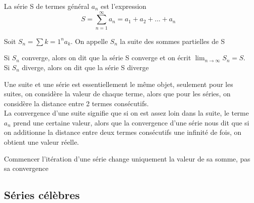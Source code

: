 \documentclass{article}
\begin{document}
\begin{definition}
    La série S de termes général $a_n$ est l'expression
    $$ S = \sum_{n=1}^{\infty} a_n = a_1 + a_2 + ... + a_n$$
\end{definition}

\begin{definition}
    Soit $S_n = \sum{k=1}^{n} a_k$. On appelle $S_n$ la suite des sommes
    partielles de S
\end{definition}

\begin{definition}
    Si $S_n$ converge, alors on dit que la série S converge et on écrit
    $ \lim_{n \to \infty} S_n = S$. Si $S_n$ diverge, alors on dit que
    la série S diverge
\end{definition}

\begin{intuition}
    Une suite et une série est essentiellement le même objet, seulement
    pour les suites, on considère la valeur de chaque terme, alors que
    pour les séries, on considère la distance entre 2 termes consécutifs.\\
    La convergence d'une suite signifie que si on est assez loin dans
    la suite, le terme $a_n$ prend une certaine valeur, alors que la
    convergence d'une série nous dit que si on additionne la distance
    entre deux termes consécutifs une infinité de fois, on obtient une
    valeur réelle.
\end{intuition}

\begin{remark}
    Commencer l'itération d'une série change uniquement la valeur de
    sa somme, pas sa convergence
\end{remark}

\begin{theorem}

\end{theorem}

\begin{theorem}

\end{theorem}



\subsection{Séries célèbres}

\begin{proposition}
\end{proposition}
\end{document}
